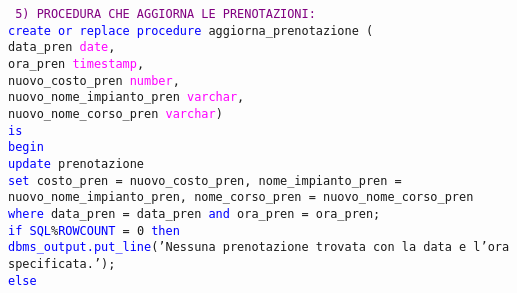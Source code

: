 \documentclass{article}
\begin{document}
    \newpage
    \begin{flushleft}
        \texttt{
        \textcolor{purple}{5) PROCEDURA CHE AGGIORNA LE PRENOTAZIONI:} \\
        \hspace*{2em}\textcolor{blue}{create or replace procedure} aggiorna\_prenotazione ( \\
        \hspace*{4em}data\_pren \textcolor{magenta}{date}, \\
        \hspace*{4em}ora\_pren \textcolor{magenta}{timestamp}, \\
        \hspace*{4em}nuovo\_costo\_pren \textcolor{magenta}{number}, \\
        \hspace*{4em}nuovo\_nome\_impianto\_pren \textcolor{magenta}{varchar}, \\
        \hspace*{4em}nuovo\_nome\_corso\_pren \textcolor{magenta}{varchar}) \\
        \hspace*{2em}\textcolor{blue}{is} \\
        \hspace*{2em}\textcolor{blue}{begin} \\
        \hspace*{4em}\textcolor{blue}{update} prenotazione \\
        \hspace*{4em}\textcolor{blue}{set} costo\_pren = nuovo\_costo\_pren, nome\_impianto\_pren = \hspace*{4em}nuovo\_nome\_impianto\_pren, nome\_corso\_pren = nuovo\_nome\_corso\_pren \\
        \hspace*{4em}\textcolor{blue}{where} data\_pren = data\_pren \textcolor{blue}{and} ora\_pren = ora\_pren; \\
        \hspace*{4em}\textcolor{blue}{if SQL}\%\textcolor{blue}{ROWCOUNT} = 0 \textcolor{blue}{then} \\
        \hspace*{6em}\textcolor{blue}{dbms\_output.put\_line}('Nessuna prenotazione trovata con la data e \hspace*{6em}l'ora specificata.'); \\
        \hspace*{4em}\textcolor{blue}{else} \\
}
\end{flushleft}
\end{document}
